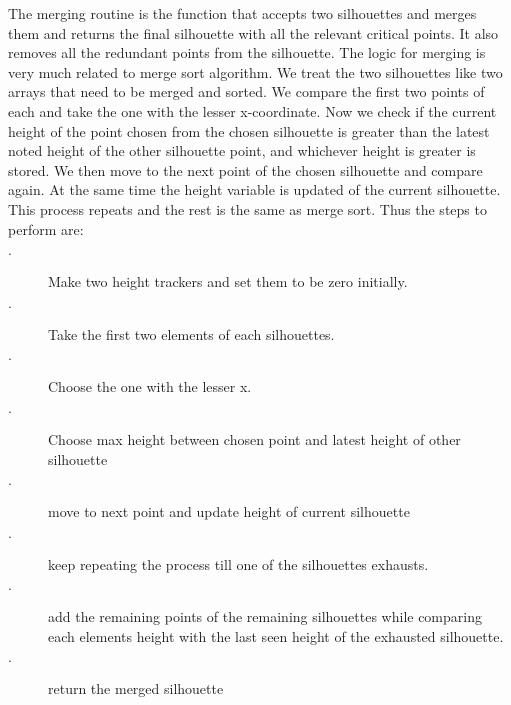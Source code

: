 \documentclass{article}
\begin{document}
The merging routine is the function that accepts two silhouettes and merges them and returns the final silhouette with all the relevant critical points. It also removes all the redundant points from the silhouette.
The logic for merging is very much related to merge sort algorithm.
We treat the two silhouettes like two arrays that need to be merged and sorted. We compare the first two points of each and take the one with the lesser x-coordinate. Now we check if the current height of the point chosen from the chosen silhouette is greater than the latest noted height of the other silhouette point, and whichever height is greater is stored.
We then move to the next point of the chosen silhouette and compare again. At the same time the height variable is updated of the current silhouette. This process repeats and the rest is the same as merge sort.
Thus the steps to perform are:
\begin{description}
  \item[$\cdot$] Make two height trackers and set them to be zero initially.
  \item[$\cdot$] Take the first two elements of each silhouettes.
  \item[$\cdot$] Choose the one with the lesser x.
  \item[$\cdot$] Choose max height between chosen point and latest height of other silhouette
  \item[$\cdot$] move to next point and update height of current silhouette
  \item[$\cdot$] keep repeating the process till one of the silhouettes exhausts.
  \item[$\cdot$] add the remaining points of the remaining silhouettes while comparing each elements height with the last seen height of the exhausted silhouette.
  \item[$\cdot$] return the merged silhouette
\end{description}
\end{document}
